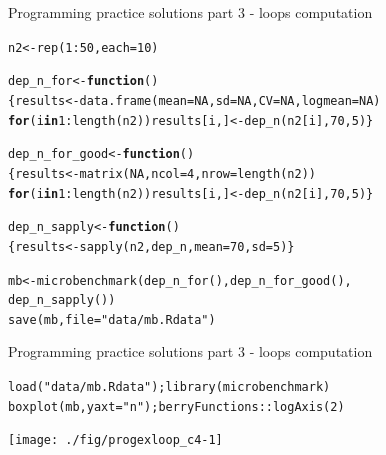 \documentclass[xcolor=table,       handout,    xcolor=dvipsnames]{beamer}\usepackage[]{graphicx}\usepackage[]{color}
\makeatletter
\newcommand{\hlnum}[1]{\textcolor[rgb]{0,0,0}{#1}}
\newcommand{\hlstr}[1]{\textcolor[rgb]{0.545,0.137,0.137}{#1}}
\newcommand{\hlopt}[1]{\textcolor[rgb]{0,0,0}{#1}}
\newcommand{\hlstd}[1]{\textcolor[rgb]{0,0,0}{#1}}
\newcommand{\hlkwa}[1]{\textcolor[rgb]{1,0,0}{\textbf{#1}}}
\newcommand{\hlkwb}[1]{\textcolor[rgb]{0,0,0}{#1}}
\newcommand{\hlkwc}[1]{\textcolor[rgb]{1,0,1}{#1}}
\newcommand{\hlkwd}[1]{\textcolor[rgb]{0,0,1}{#1}}
\newenvironment{kframe}{%
 \def\at@end@of@kframe{}%
 \ifinner\ifhmode%
  \def\at@end@of@kframe{\end{minipage}}%
  \begin{minipage}{\columnwidth}%
 \fi\fi%
 \def\FrameCommand##1{\hskip\@totalleftmargin \hskip-\fboxsep
 \colorbox{shadecolor}{##1}\hskip-\fboxsep
     \hskip-\linewidth \hskip-\@totalleftmargin \hskip\columnwidth}%
 \MakeFramed {\advance\hsize-\width
   \@totalleftmargin\z@ \linewidth\hsize
   \@setminipage}}%
 {\par\unskip\endMakeFramed%
 \at@end@of@kframe}
\newenvironment{knitrout}{}{} %
\makeatother
\begin{document}
\begin{frame}[fragile]{Programming practice solutions part 3 - loops computation}
\begin{knitrout}\small
{}\color{fgcolor}\begin{kframe}
\begin{alltt}
\hlstd{n2} \hlkwb{<-} \hlkwd{rep}\hlstd{(}\hlnum{1}\hlopt{:}\hlnum{50}\hlstd{,} \hlkwc{each}\hlstd{=}\hlnum{10}\hlstd{)}

\hlstd{dep_n_for} \hlkwb{<-} \hlkwa{function}\hlstd{()}
 \hlstd{\{results} \hlkwb{<-} \hlkwd{data.frame}\hlstd{(}\hlkwc{mean}\hlstd{=}\hlnum{NA}\hlstd{,} \hlkwc{sd}\hlstd{=}\hlnum{NA}\hlstd{,} \hlkwc{CV}\hlstd{=}\hlnum{NA}\hlstd{,} \hlkwc{logmean}\hlstd{=}\hlnum{NA}\hlstd{)}
  \hlkwa{for}\hlstd{(i} \hlkwa{in} \hlnum{1}\hlopt{:}\hlkwd{length}\hlstd{(n2)) results[i, ]} \hlkwb{<-} \hlkwd{dep_n}\hlstd{(n2[i],} \hlnum{70}\hlstd{,}\hlnum{5}\hlstd{)\}}

\hlstd{dep_n_for_good} \hlkwb{<-} \hlkwa{function}\hlstd{()}
 \hlstd{\{results} \hlkwb{<-} \hlkwd{matrix}\hlstd{(}\hlnum{NA}\hlstd{,} \hlkwc{ncol}\hlstd{=}\hlnum{4}\hlstd{,} \hlkwc{nrow}\hlstd{=}\hlkwd{length}\hlstd{(n2))}
  \hlkwa{for}\hlstd{(i} \hlkwa{in} \hlnum{1}\hlopt{:}\hlkwd{length}\hlstd{(n2)) results[i, ]} \hlkwb{<-} \hlkwd{dep_n}\hlstd{(n2[i],} \hlnum{70}\hlstd{,}\hlnum{5}\hlstd{)\}}

\hlstd{dep_n_sapply} \hlkwb{<-} \hlkwa{function}\hlstd{()}
\hlstd{\{results} \hlkwb{<-} \hlkwd{sapply}\hlstd{(n2, dep_n,} \hlkwc{mean}\hlstd{=}\hlnum{70}\hlstd{,}\hlkwc{sd}\hlstd{=}\hlnum{5}\hlstd{)\}}

\hlstd{mb} \hlkwb{<-} \hlkwd{microbenchmark}\hlstd{(}\hlkwd{dep_n_for}\hlstd{(),} \hlkwd{dep_n_for_good}\hlstd{(),}
                     \hlkwd{dep_n_sapply}\hlstd{())}
\hlkwd{save}\hlstd{(mb,} \hlkwc{file}\hlstd{=}\hlstr{"data/mb.Rdata"}\hlstd{)}
\end{alltt}
\end{kframe}
\end{knitrout}
\end{frame}


\begin{frame}[fragile]{Programming practice solutions part 3 - loops computation}
\begin{knitrout}
\color{fgcolor}\begin{kframe}
\begin{alltt}
\hlkwd{load}\hlstd{(}\hlstr{"data/mb.Rdata"}\hlstd{);} \hlkwd{library}\hlstd{(microbenchmark)}
\hlkwd{boxplot}\hlstd{(mb,} \hlkwc{yaxt}\hlstd{=}\hlstr{"n"}\hlstd{); berryFunctions}\hlopt{::}\hlkwd{logAxis}\hlstd{(}\hlnum{2}\hlstd{)}
\end{alltt}
\end{kframe}

{\centering \texttt{[image: ./fig/progexloop\_c4-1]} 

}



\end{knitrout}
\end{frame}
\end{document}
